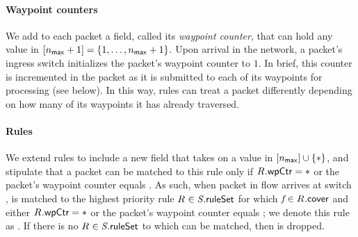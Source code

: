 \paragraph{Waypoint counters}  We add to each packet a field, called its
\textit{waypoint counter}, that can hold any value in
$[{n_{\mathsf{max}}+1}] = \{1, \ldots, n_{\mathsf{max}}+1\}$.  Upon arrival in
the network, a packet's ingress switch initializes the packet's
waypoint counter to $1$.  In brief, this counter is incremented in the
packet as it is submitted to each of its waypoints for processing (see
below).  In this way, rules can treat a packet differently depending
on how many of its waypoints it has already traversed.

\paragraph{Rules} We extend rules to include a new field
 that takes on a value in $[{n_{\mathsf{max}}}] \cup
\{\ast\}$, and stipulate that a packet can be matched to this rule
only if $\ruleID{}{\wpField} = \ast$ or the packet's waypoint counter
equals .  As such, when packet \pktID{} in flow
\flowID{} arrives at switch \switchID{}, \pktID{} is matched to the
highest priority rule $\ruleID{} \in \switchID{}{\ruleSet}$ for which
$\flowID{} \in \ruleID{}{\coverField}$ and either $\ruleID{}{\wpField}
= \ast$ or the packet's waypoint counter equals ;
we denote this rule as .  If there is
no $\ruleID{} \in \switchID{}{\ruleSet}$ to which \pktID{} can be
matched, then \pktID{} is dropped.

